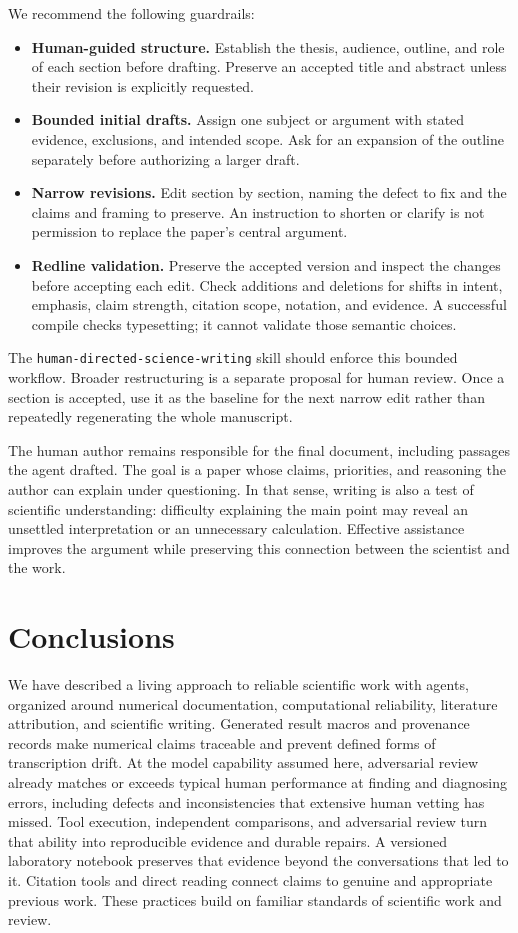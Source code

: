 \documentclass[aps,prd,reprint,nofootinbib]{revtex4-2}
\begin{document}
We recommend the following guardrails:
\begin{itemize}
\item \textbf{Human-guided structure.} Establish the thesis, audience, outline, and role of each section before drafting. Preserve an accepted title and abstract unless their revision is explicitly requested.
\item \textbf{Bounded initial drafts.} Assign one subject or argument with stated evidence, exclusions, and intended scope. Ask for an expansion of the outline separately before authorizing a larger draft.
\item \textbf{Narrow revisions.} Edit section by section, naming the defect to fix and the claims and framing to preserve. An instruction to shorten or clarify is not permission to replace the paper's central argument.
\item \textbf{Redline validation.} Preserve the accepted version and inspect the changes before accepting each edit. Check additions and deletions for shifts in intent, emphasis, claim strength, citation scope, notation, and evidence. A successful compile checks typesetting; it cannot validate those semantic choices.
\end{itemize}
The \texttt{human-directed-science-writing} skill should enforce this bounded workflow. Broader restructuring is a separate proposal for human review. Once a section is accepted, use it as the baseline for the next narrow edit rather than repeatedly regenerating the whole manuscript.

The human author remains responsible for the final document, including passages the agent drafted. The goal is a paper whose claims, priorities, and reasoning the author can explain under questioning. In that sense, writing is also a test of scientific understanding: difficulty explaining the main point may reveal an unsettled interpretation or an unnecessary calculation. Effective assistance improves the argument while preserving this connection between the scientist and the work.

\section{Conclusions}\label{sec:conclusions}
We have described a living approach to reliable scientific work with agents, organized around numerical documentation, computational reliability, literature attribution, and scientific writing. Generated result macros and provenance records make numerical claims traceable and prevent defined forms of transcription drift. At the model capability assumed here, adversarial review already matches or exceeds typical human performance at finding and diagnosing errors, including defects and inconsistencies that extensive human vetting has missed. Tool execution, independent comparisons, and adversarial review turn that ability into reproducible evidence and durable repairs. A versioned laboratory notebook preserves that evidence beyond the conversations that led to it. Citation tools and direct reading connect claims to genuine and appropriate previous work. These practices build on familiar standards of scientific work and review.
\end{document}
